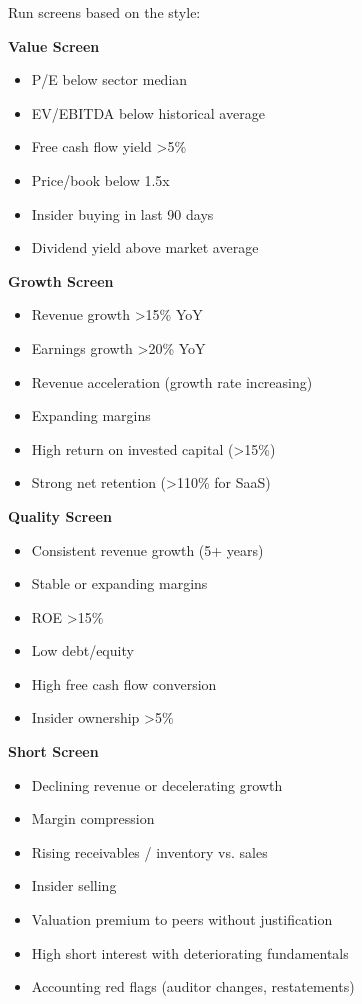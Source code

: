 \documentclass[11pt]{article}
\begin{document}
Run screens based on the style:


\textbf{Value Screen}

\begin{itemize}[leftmargin=*,itemsep=2pt,topsep=2pt]
\item {} P/E below sector median
\item {} EV/EBITDA below historical average
\item {} Free cash flow yield >5\%
\item {} Price/book below 1.5x
\item {} Insider buying in last 90 days
\item {} Dividend yield above market average
\end{itemize}

\textbf{Growth Screen}

\begin{itemize}[leftmargin=*,itemsep=2pt,topsep=2pt]
\item {} Revenue growth >15\% YoY
\item {} Earnings growth >20\% YoY
\item {} Revenue acceleration (growth rate increasing)
\item {} Expanding margins
\item {} High return on invested capital (>15\%)
\item {} Strong net retention (>110\% for SaaS)
\end{itemize}

\textbf{Quality Screen}

\begin{itemize}[leftmargin=*,itemsep=2pt,topsep=2pt]
\item {} Consistent revenue growth (5+ years)
\item {} Stable or expanding margins
\item {} ROE >15\%
\item {} Low debt/equity
\item {} High free cash flow conversion
\item {} Insider ownership >5\%
\end{itemize}

\textbf{Short Screen}

\begin{itemize}[leftmargin=*,itemsep=2pt,topsep=2pt]
\item {} Declining revenue or decelerating growth
\item {} Margin compression
\item {} Rising receivables / inventory vs. sales
\item {} Insider selling
\item {} Valuation premium to peers without justification
\item {} High short interest with deteriorating fundamentals
\item {} Accounting red flags (auditor changes, restatements)
\end{itemize}
\end{document}
